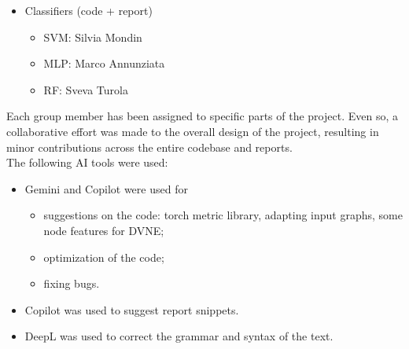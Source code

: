 \begin{itemize}
\begin{itemize}
            \item LINE: Sveva Turola
            \item DVNE: Marco Annunziata
            \item GraphSage: Sveva Turola
        \end{itemize}
    \item Classifiers (code + report)
        \begin{itemize}
            \item SVM: Silvia Mondin
            \item MLP: Marco Annunziata
            \item RF: Sveva Turola
        \end{itemize}
\end{itemize}
Each group member has been assigned to specific parts of the project. 
Even so, a collaborative effort was made to the overall design of the project, resulting in minor contributions across the entire codebase and reports.
\\\newline
The following AI tools were used:
\begin{itemize}
    \item Gemini and Copilot were used for 
    \begin{itemize}
        \item suggestions on the code: torch metric library, adapting input graphs, some node features for DVNE;
        \item optimization of the code;
        \item fixing bugs.
    \end{itemize}
    \item Copilot was used to suggest report snippets.
    \item DeepL was used to correct the grammar and syntax of the text.
\end{itemize}
